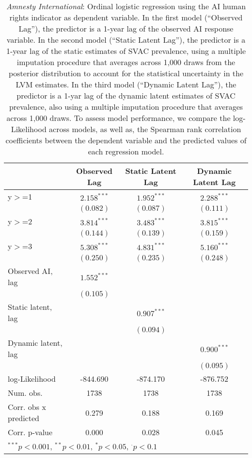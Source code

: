 
\begin{table}[h]
\begin{center}
\begin{tabular}{l c c c }
\hline
 & Observed Lag & Static Latent Lag & Dynamic Latent Lag \\
\hline
y$>$=1                & $2.158^{***}$ & $1.952^{***}$ & $2.288^{***}$ \\
                      & $(0.082)$     & $(0.087)$     & $(0.111)$     \\
y$>$=2                & $3.814^{***}$ & $3.483^{***}$ & $3.815^{***}$ \\
                      & $(0.144)$     & $(0.139)$     & $(0.159)$     \\
y$>$=3                & $5.308^{***}$ & $4.831^{***}$ & $5.160^{***}$ \\
                      & $(0.250)$     & $(0.235)$     & $(0.248)$     \\
Observed AI, lag      & $1.552^{***}$ &               &               \\
                      & $(0.105)$     &               &               \\
Static  latent, lag   &               & $0.907^{***}$ &               \\
                      &               & $(0.094)$     &               \\
Dynamic latent, lag   &               &               & $0.900^{***}$ \\
                      &               &               & $(0.095)$     \\
\hline
log-Likelihood        & -844.690      & -874.170      & -876.752      \\
Num. obs.             & 1738          & 1738          & 1738          \\
Corr. obs x predicted & 0.279         & 0.188         & 0.169         \\
Corr. p-value         & 0.000         & 0.028         & 0.045         \\
\hline
\multicolumn{4}{l}{\scriptsize{$^{***}p<0.001$, $^{**}p<0.01$, $^*p<0.05$, $^{\cdot}p<0.1$}}
\end{tabular}
\caption{\emph{Amnesty International}: Ordinal logistic regression using the AI human rights 
       indicator as dependent variable. In the first model (``Observed Lag''), the predictor is a 1-year lag
       of the observed AI response variable. In the second model (``Static Latent Lag''), the predictor is a 1-year
       lag of the static estimates of SVAC prevalence, using a multiple imputation procedure that averages across 1,000 draws 
        from the posterior distribution to account for the statistical uncertainty in the LVM estimates. 
       In the third model (``Dynamic Latent Lag''), the predictor is a 1-yar lag of the dynamic latent 
       estimates of SVAC prevalence, also using a multiple imputation procedure that averages across 1,000 draws. To assess
       model performance, we compare the log-Likelihood across models, as well as, the Spearman rank
       correlation coefficients between the dependent variable and the predicted values of each regression
       model.}
\label{xt-ai}
\end{center}
\end{table}
